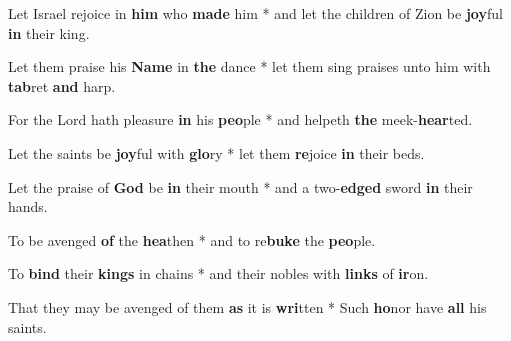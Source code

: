 \begin{multicols}{2}
	Let Israel rejoice in \textbf{him} who \textbf{made} him * and let the children of Zion be \textbf{joy}ful \textbf{in} their king.
	
	Let them praise his \textbf{Name} in \textbf{the} dance * let them sing praises unto him with \textbf{tab}ret \textbf{and} harp.
	
	For the Lord hath pleasure \textbf{in} his \textbf{peo}ple * and helpeth \textbf{the} meek-\textbf{hear}ted.
	
	Let the saints be \textbf{joy}ful with \textbf{glo}ry * let them \textbf{re}joice \textbf{in} their beds.
	
	Let the praise of \textbf{God} be \textbf{in} their mouth * and a two-\textbf{edged} sword \textbf{in} their hands.
	
	To be avenged \textbf{of} the \textbf{hea}then * and to re\textbf{buke} the \textbf{peo}ple.
	
	To \textbf{bind} their \textbf{kings} in chains * and their nobles with \textbf{links} of \textbf{ir}on.
	
	That they may be avenged of them \textbf{as} it is \textbf{wri}tten * Such \textbf{ho}nor have \textbf{all} his saints.
\end{multicols}